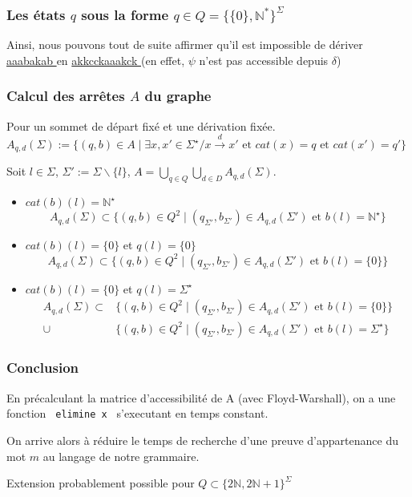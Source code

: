 \documentclass[12pt]{beamer}
\begin{document}
\begin{frame}\frametitle{Les états $q$ sous la forme $q \in Q = \{\{0\},\mathbb{N}^*\}^{\Sigma}$}


Ainsi, nous pouvons tout de suite affirmer qu'il est impossible de dériver \underline{ aaabakab } en \underline{ akkcckaaakck } (en effet, $\psi$ n'est pas accessible depuis $\delta$)

\end{frame}

\begin{frame}\frametitle{Calcul des arrêtes $A$ du graphe}
Pour un sommet de départ fixé et une dérivation fixée.
$A_{q,d}(\Sigma) := \{(q,b) \in A \mid \exists x,x' \in \Sigma^\star / x \overset{d}{\rightarrow} x' \text{ et } cat(x) = q \text{ et } cat(x') = q'\}$

Soit $l \in \Sigma$, $\Sigma ' := \Sigma \backslash \{l\}$, $A = \bigcup_{q \in Q}  \bigcup_{d \in D} A_{q,d}(\Sigma)$.

\begin{itemize}
\item $cat(b)(l) = \mathbb{N}^\star$
\begin{equation*}A_{q,d}(\Sigma) \subset \{(q,b) \in Q^2 \mid (q_{\Sigma '},b_{\Sigma '}) \in A_{q,d}(\Sigma ') \text{ et } b(l) = \mathbb{N}^\star\}\end{equation*}

\item $cat(b)(l) = \{0\}$ et $q(l) = \{0\}$
\begin{equation*}A_{q,d}(\Sigma) \subset \{(q,b) \in Q^2 \mid (q_{\Sigma '},b_{\Sigma '}) \in A_{q,d}(\Sigma ') \text{ et } b(l) = \{0\}\}\end{equation*}

\item $cat(b)(l) = \{0\}$ et $q(l) = \Sigma^\star$
\begin{align*}
A_{q,d}(\Sigma) \subset &\{(q,b) \in Q^2 \mid (q_{\Sigma '},b_{\Sigma '}) \in A_{q,d}(\Sigma ') \text{ et } b(l) = \{0\}\} \\
\cup &\{(q,b) \in Q^2 \mid (q_{\Sigma '},b_{\Sigma '}) \in A_{q,d}(\Sigma ') \text{ et } b(l) = \Sigma^\star\}
\end{align*}
\end{itemize}
\end{frame}

\begin{frame}\frametitle{Conclusion}
En précalculant la matrice d'accessibilité de A (avec Floyd-Warshall), on a une fonction \texttt{ elimine x } s'executant en temps constant.

On arrive alors à réduire le temps de recherche d'une preuve d'appartenance du mot $m$ au langage de notre grammaire.

Extension probablement possible pour $Q \subset \{2 \mathbb{N} , 2 \mathbb{N} + 1 \}^\Sigma$
\end{frame}
\end{document}
